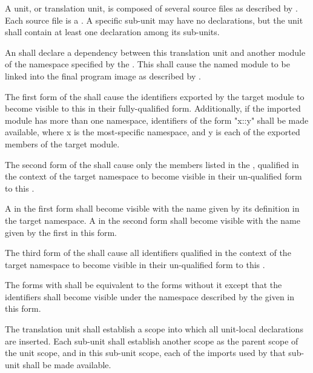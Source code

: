 \specsubitem
A unit, or translation unit, is composed of several source files as described
by . Each source file is a .
A specific sub-unit may have no declarations, but the unit shall contain at
least one declaration among its sub-units.

\specsubitem
An  shall declare a dependency between this translation
unit and another module of the namespace specified by the
 . This shall cause the named
module to be linked into the final program image as described by
.

\specsubitem
The first form of the  shall cause the identifiers
exported by the target module to become visible to this 
in their fully-qualified form. Additionally, if the imported module has more
than one namespace, identifiers of the form "x::y" shall be made available,
where x is the most-specific namespace, and y is each of the exported members
of the target module.

\specsubitem
The second form of the  shall cause only the members
listed in the , qualified in the context of the target
namespace to become visible in their un-qualified form to this
.

\specsubitem
A  in the first form shall become visible with the name
given by its definition in the target namespace. A  in the
second form shall become visible with the name given by the first
 in this form.


\specsubitem
The third form of the  shall cause all identifiers
qualified in the context of the target namespace to become visible in their
un-qualified form to this .

\specsubitem
The forms with  shall be equivalent to the forms without
it except that the identifiers shall become visible under the namespace
described by the  given in this form.


\specsubitem
The translation unit shall establish a scope into which all
unit-local declarations are inserted. Each sub-unit shall establish another
scope as the parent scope of the unit scope, and in this sub-unit
scope, each of the imports used by that sub-unit shall be made available.

